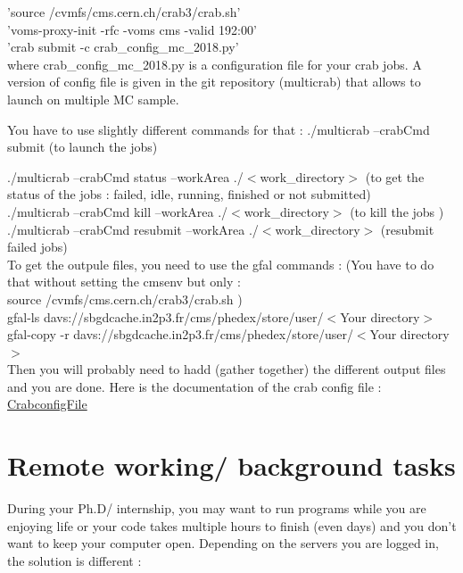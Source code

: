 \documentclass[reprint, a4paper, nofootinbib, amsmath, amssymb, aps]{revtex4-1}
\begin{document}
'source /cvmfs/cms.cern.ch/crab3/crab.sh' \\
'voms-proxy-init -rfc -voms cms -valid 192:00'\\
'crab submit -c crab\_config\_mc\_2018.py' \\

where crab\_config\_mc\_2018.py is a configuration file for your crab jobs. A version of config file is given in the git repository (multicrab) that allows to launch on multiple  MC sample.

You have to use slightly different commands for that :
./multicrab --crabCmd submit (to launch the jobs)

./multicrab --crabCmd status --workArea ./$<$work\_directory$>$ (to get the status of the jobs : failed, idle, running, finished or not submitted)\\
./multicrab --crabCmd kill --workArea ./$<$work\_directory$>$ (to kill the jobs )\\
./multicrab --crabCmd resubmit --workArea ./$<$work\_directory$>$ (resubmit failed jobs)\\

To get the outpule files, you need to use the gfal commands :
(You have to do that without setting the cmsenv but only :\\
source /cvmfs/cms.cern.ch/crab3/crab.sh )\\
gfal-ls davs://sbgdcache.in2p3.fr/cms/phedex/store/user/$<$Your directory$>$\\
gfal-copy -r davs://sbgdcache.in2p3.fr/cms/phedex/store/user/$<$Your directory$>$ \\
Then you will probably need to hadd (gather together) the different output files and you are done.
Here is the documentation of the crab config file : \\
\href{https://twiki.cern.ch/twiki/bin/view/CMSPublic/CRAB3ConfigurationFile}{CrabconfigFile}

\section{Remote working/ background tasks}

During your Ph.D/ internship, you may want to run programs while you are enjoying life or your code takes multiple hours to finish (even days) and you don't want to keep your computer open. Depending on the servers you are logged in, the solution is different :
\end{document}
